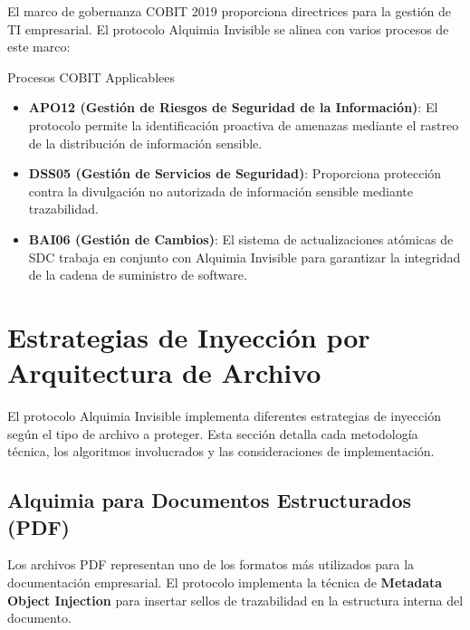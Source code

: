 El marco de gobernanza COBIT 2019 proporciona directrices para la gestión de TI empresarial. El protocolo Alquimia Invisible se alinea con varios procesos de este marco:

\begin{caja}{Procesos COBIT Applicablees}
\begin{itemize}
\item \textbf{APO12 (Gestión de Riesgos de Seguridad de la Información)}: El protocolo permite la identificación proactiva de amenazas mediante el rastreo de la distribución de información sensible.

\item \textbf{DSS05 (Gestión de Servicios de Seguridad)}: Proporciona protección contra la divulgación no autorizada de información sensible mediante trazabilidad.

\item \textbf{BAI06 (Gestión de Cambios)}: El sistema de actualizaciones atómicas de SDC trabaja en conjunto con Alquimia Invisible para garantizar la integridad de la cadena de suministro de software.
\end{itemize}
\end{caja}

\section{Estrategias de Inyección por Arquitectura de Archivo}
\label{sec:ai-estrategias}

El protocolo Alquimia Invisible implementa diferentes estrategias de inyección según el tipo de archivo a proteger. Esta sección detalla cada metodología técnica, los algoritmos involucrados y las consideraciones de implementación.

\subsection{Alquimia para Documentos Estructurados (PDF)}
\label{sec:ai-pdf}

Los archivos PDF representan uno de los formatos más utilizados para la documentación empresarial. El protocolo implementa la técnica de \textbf{Metadata Object Injection} para insertar sellos de trazabilidad en la estructura interna del documento.


